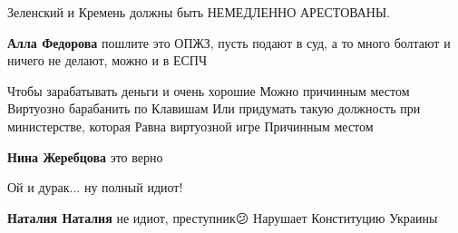 \begin{itemize}
Зеленский и Кремень должны быть НЕМЕДЛЕННО АРЕСТОВАНЫ.

\begin{itemize}
 
\textbf{Алла Федорова} пошлите это ОПЖЗ, пусть подают в суд, а то много болтают и ничего не делают, можно и в ЕСПЧ
\end{itemize}

 

\obeycr
Чтобы зарабатывать деньги и очень хорошие
Можно причинным местом
Виртуозно барабанить по
Клавишам
Или придумать такую должность при министерстве, которая
Равна виртуозной игре
Причинным местом
\restorecr

\begin{itemize}
 
\textbf{Нина Жеребцова} это верно
\end{itemize}

 
Ой и дурак... ну полный идиот!

\begin{itemize}
 
\textbf{Наталия Наталия} не идиот, преступник😕 Нарушает Конституцию Украины
\end{itemize}


\end{itemize}
